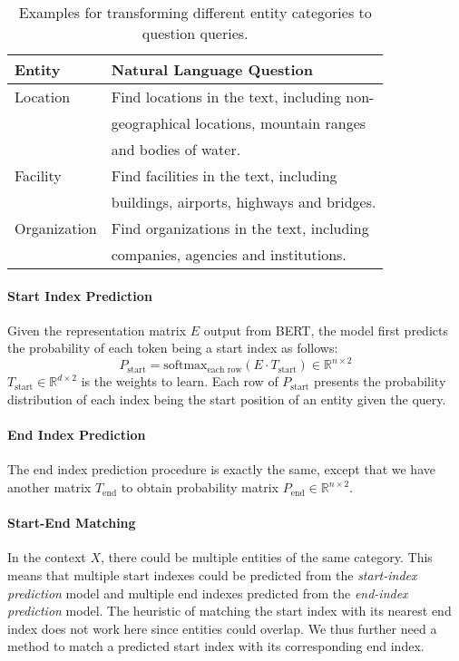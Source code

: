 \documentclass[11pt,a4paper]{article}
\begin{document}
\begin{table}[t]
\center
\small
\begin{tabular}{ll}\hline
{\bf Entity} & {\bf Natural Language Question} \\\hline
Location  & Find locations in the text,  including  non-\\
&geographical locations, mountain ranges
\\
&and bodies of water.  \\
Facility & Find facilities in the text, including \\
&buildings,  airports, highways and bridges.  \\ 
Organization  & Find organizations  in the text, including \\
& companies, agencies and institutions.  \\\hline
\end{tabular}
\caption{Examples for transforming different entity categories to question queries. }
\label{entitytemplate}
\end{table}

\paragraph{Start Index Prediction}
Given the 
representation matrix 
$E$ output from BERT, the model first  predicts the probability of each token being a start index as follows:
\begin{equation}
    P_\text{start}=\text{softmax}_\text{each row}(E\cdot T_\text{start})\in\mathbb{R}^{n\times 2}
\end{equation}
$T_\text{start}\in\mathbb{R}^{d\times 2}$ 
 is the weights to learn. Each row of $P_\text{start}$ presents the probability distribution of each index being the start position of an entity given the query. 
 
 \paragraph{End Index Prediction}
The end index prediction procedure is exactly the same, except that we have another matrix $T_\text{end}$ to obtain probability matrix $P_\text{end}\in\mathbb{R}^{n\times 2}$.

 
 


\paragraph{Start-End Matching}
In the  context $X$, there could be multiple entities of the same category. This means
that 
 multiple start indexes could be predicted from the {\it start-index prediction} model and multiple end indexes predicted from the {\it end-index prediction} model. The heuristic of matching the start index with its nearest end index does not work here since entities could overlap. 
We thus further need a method to match a predicted start index with its corresponding end index. 
\end{document}
